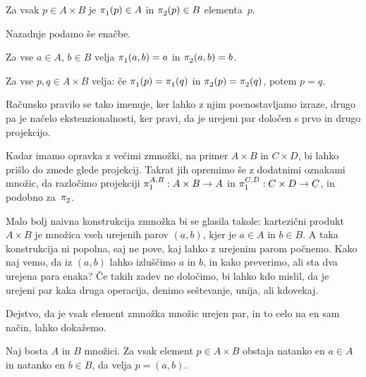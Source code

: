 \begin{pravilo}
  \label{pravilo:zmnozek-uporaba}
  Za vsak $p \in A \times B$ je $\fst(p) \in A$  in $\snd(p) \in B$
   elementa~$p$.
\end{pravilo}

Nazadnje podamo še enačbe.

\begin{pravilo}
  \label{pravilo:zmnozek-racunanje}
  Za vse $a \in A$, $b \in B$ velja $\fst(a, b) = a$ in $\snd(a, b) = b$.
\end{pravilo}

\begin{pravilo}
  \label{pravilo:zmnozek-ekstenzionalnost}
  Za vse $p, q \in A \times B$ velja: če $\fst(p) = \fst(q)$ in $\snd(p) = \snd(q)$,
  potem $p = q$.
\end{pravilo}

\noindent
%
Računsko pravilo se tako imenuje, ker lahko z njim poenostavljamo izraze, drugo pa je
načelo ekstenzionalnosti, ker pravi, da je urejeni par določen s prvo in drugo projekcijo.

Kadar imamo opravka z večimi zmnožki, na primer $A \times B$ in $C \times D$, bi lahko
prišlo do zmede glede projekcij. Takrat jih opremimo še z dodatnimi oznakami množic, da
razločimo projekciji $\fst[A][B] : A \times B \to A$ in $\fst[C][D] : C \times D \to C$,
in podobno za~$\snd$.

Malo bolj naivna konstrukcija zmnožka bi se glasila takole: kartezični produkt
$A \times B$ je množica vseh urejenih parov $(a, b)$, kjer je $a \in A$ in $b \in B$. A
taka konstrukcija ni popolna, saj ne pove, kaj lahko z urejenim parom počnemo. Kako naj
vemo, da iz $(a, b)$ lahko izluščimo $a$ in $b$, in kako preverimo, ali sta dva urejena
para enaka? Če takih zadev ne določimo, bi lahko kdo mislil, da je urejeni par kaka druga
operacija, denimo seštevanje, unija, ali kdovekaj.

Dejstvo, da je vsak element zmnožka množic urejen par, in to celo na en sam način, lahko
dokažemo.

\begin{trditev}
  Naj bosta $A$ in $B$ množici. Za vsak element $p \in A \times B$ obstaja natanko en
  $a \in A$ in natanko en $b \in B$, da velja $p = (a, b)$.
\end{trditev}

